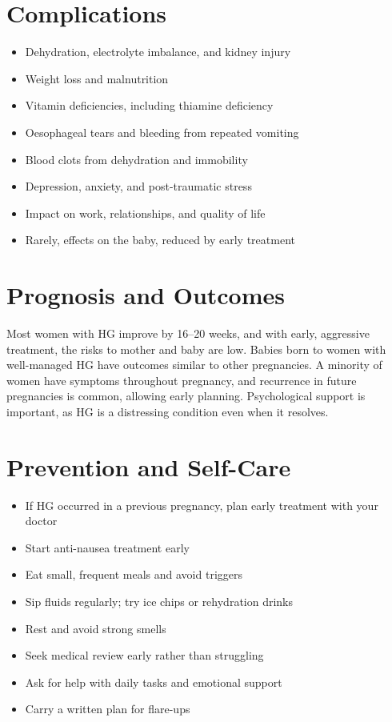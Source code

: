 \section*{Complications}
\begin{itemize}
    \item Dehydration, electrolyte imbalance, and kidney injury
    \item Weight loss and malnutrition
    \item Vitamin deficiencies, including thiamine deficiency
    \item Oesophageal tears and bleeding from repeated vomiting
    \item Blood clots from dehydration and immobility
    \item Depression, anxiety, and post-traumatic stress
    \item Impact on work, relationships, and quality of life
    \item Rarely, effects on the baby, reduced by early treatment
\end{itemize}

\section*{Prognosis and Outcomes}
Most women with HG improve by 16--20 weeks, and with early, aggressive treatment, the risks to mother and baby are low. Babies born to women with well-managed HG have outcomes similar to other pregnancies. A minority of women have symptoms throughout pregnancy, and recurrence in future pregnancies is common, allowing early planning. Psychological support is important, as HG is a distressing condition even when it resolves.

\section*{Prevention and Self-Care}
\begin{itemize}
    \item If HG occurred in a previous pregnancy, plan early treatment with your doctor
    \item Start anti-nausea treatment early
    \item Eat small, frequent meals and avoid triggers
    \item Sip fluids regularly; try ice chips or rehydration drinks
    \item Rest and avoid strong smells
    \item Seek medical review early rather than struggling
    \item Ask for help with daily tasks and emotional support
    \item Carry a written plan for flare-ups
\end{itemize}


